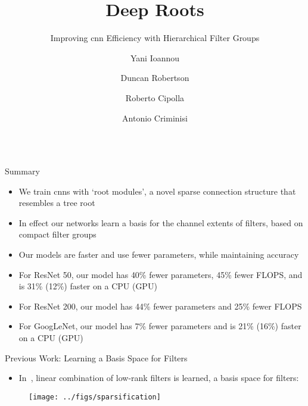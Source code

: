\documentclass[final]{beamer}
\title %
{Deep Roots}
\subtitle{Improving \gls{cnn} Efficiency with Hierarchical Filter Groups}
\author[Y. Ioannou, D. Robertson, R. Cipolla and A. Criminisi]
{Yani Ioannou\inst{1} \and Duncan Robertson\inst{2} \and Roberto Cipolla\inst{1} \and Antonio Criminisi\inst{2}}
\institute[University of Cambridge and Microsoft Research] %
{\inst{1} University of Cambridge, \inst{2} Microsoft Research, Cambridge}
\date
\begin{document}


\begin{frame}{}

\begin{columns}[t]

\begin{column}{0.32\paperwidth}

\begin{block}{Summary}
  \begin{itemize}
	\item We train \glspl{cnn} with `root modules', a novel sparse connection structure that resembles a tree root
    \item In effect our networks learn a basis for the channel extents of filters, based on compact filter groups
	\item Our models are \alert{faster} and use \alert{fewer parameters}, while maintaining \alert{accuracy}
      \item For \alert{ResNet 50}, our model has \alert{40\%} fewer parameters, \alert{45\%} fewer FLOPS, and is 31\% (12\%) faster on a CPU (GPU)
      \item For \alert{ResNet 200}, our model has \alert{44\%} fewer parameters and \alert{25\%} fewer FLOPS
      \item For GoogLeNet, our model has 7\% fewer parameters and is 21\% (16\%) faster on a CPU (GPU)
  \end{itemize}
\end{block}

\begin{block}{Previous Work: Learning a Basis Space for Filters}{}
\begin{itemize}
   \item In~\citep{Ioannou2016}, linear combination of low-rank filters is learned, \ie a basis space for filters:
\end{itemize}

\vspace{1em}

\begin{figure}
   \texttt{[image: ../figs/sparsification]}
\end{figure}


\end{block}
\end{column}
\end{columns}
\end{frame}
\end{document}
